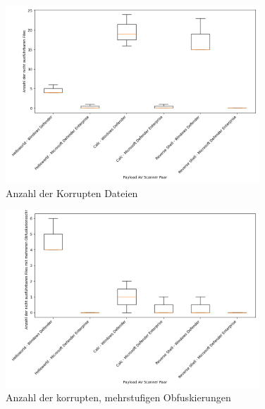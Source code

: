 \begin{figure}[]
    \centering
    \includegraphics[width=0.85\textwidth]{gfx/Desktriptiv/corrupt_overview.png}
    \caption{Anzahl der Korrupten Dateien}
    \label{fig:corrupt_overview}
\end{figure}
\begin{figure}[h]
    \centering
    \includegraphics[width=0.85\textwidth]{gfx/Desktriptiv/multicor_overview.png}
    \caption{Anzahl der korrupten, mehrstufigen Obfuskierungen}
    \label{fig:multicor_overview}
\end{figure}
